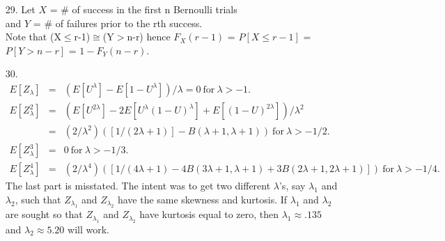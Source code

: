 \begin{enumerate}
	\item[29.] Let $X$ = \# of success in the first n Bernoulli trials \\
	and $Y$ = \# of failures prior to the rth success. \\
	Note that (X$\le$r-1)$\cong$(Y$>$n-r) hence $F_X(r-1)$ = $P[X\le r-1]$ = $P[Y> n-r]$  = $1 - F_Y(n-r)$.
	
	\item[30.]${}$\vspace{-7.5ex}\begin{eqnarray*}
	E[Z_\lambda] &=& (E[U^\lambda]-E[1-U^\lambda])/\lambda = 0\ \text{for}\ \lambda >-1. \\
	E[Z_\lambda^2] &=& (E[U^{2\lambda}] -2E[U^\lambda(1-U)^\lambda] + E[(1-U)^{2\lambda}])/\lambda^2 \\
	&=& (2/\lambda^2)([1/(2\lambda+1)] - B(\lambda+1,\lambda+1))\ \text{for}\ \lambda > -1/2. \\
	E[Z_\lambda^3] &=& 0\ \text{for}\ \lambda > -1/3. \\
	E[Z_\lambda^4] &=&(2/\lambda^4)([1/(4\lambda+1) - 4B(3\lambda+1,\lambda+1) + 3B(2\lambda+1,2\lambda+1)])\ \text{for}\ \lambda > -1/4.
	\end{eqnarray*}	
	The last part is misstated.  The intent was to get two different $\lambda$'s, say $\lambda_1$ and $\lambda_2$, such that $Z_{\lambda_1}$ and $Z_{\lambda_2}$ have the same skewness and kurtosis.  If $\lambda_1$ and $\lambda_2$ are sought so that $Z_{\lambda_1}$ and $Z_{\lambda_2}$ have kurtosis equal to zero, then $\lambda_1\approx .135$ and $\lambda_2\approx 5.20$ will work. 
	
\end{enumerate}

